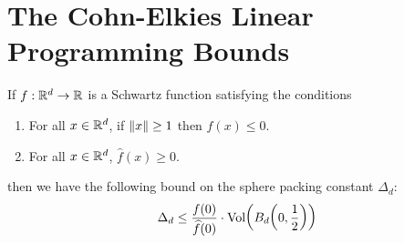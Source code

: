 \section{The Cohn-Elkies Linear Programming Bounds}\label{Ch2:Sec:CohnElkies}

\begin{boxtheorem}\label{SP:Thm:CohnElkies:Blueprint} %
    If $f : \mathbb{R}^d \to \mathbb{R}$ is a Schwartz function satisfying the conditions
    \begin{enumerate}[label = \normalfont(CE\arabic*)]
        \item For all $x \in \mathbb{R}^d$, if $\left\lVert x \right\rVert \geq 1$ then $f(x) \leq 0$.
        \item For all $x \in \mathbb{R}^d$, $\hat{f}(x) \geq 0$.
    \end{enumerate}
    then we have the following bound on the sphere packing constant $\Delta_d$:
    \begin{align*}
        \Delta_d \leq \frac{f(0)}{\widehat{f}(0)} \cdot \operatorname{Vol}\!\left( B_d\!\left( 0, \frac{1}{2} \right) \right)
    \end{align*}
\end{boxtheorem}